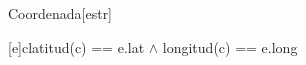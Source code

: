 \begin{Representacion}


	\begin{Estructura}{Coordenada}[estr]
		\begin{Tupla}[estr]
		\end{Tupla}

	\end{Estructura}





	{c}{latitud(c) == e.lat $\land$ longitud(c) == e.long}

\end{Representacion}


